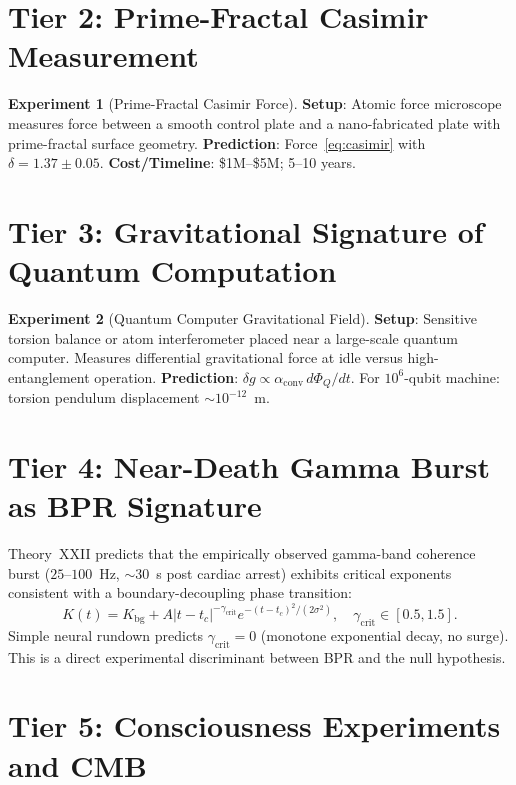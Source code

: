 \documentclass[12pt,oneside]{book}
\theoremstyle{definition}
\newtheorem{experiment}{Experiment}[chapter]
\begin{document}
\section{Tier 2: Prime-Fractal Casimir Measurement}

\begin{experiment}[Prime-Fractal Casimir Force]
  \textbf{Setup}: Atomic force microscope measures force between a smooth control
  plate and a nano-fabricated plate with prime-fractal surface geometry.
  \textbf{Prediction}: Force~\eqref{eq:casimir} with $\delta = 1.37 \pm 0.05$.
  \textbf{Cost/Timeline}: \$1M--\$5M; 5--10 years.
\end{experiment}

\section{Tier 3: Gravitational Signature of Quantum Computation}

\begin{experiment}[Quantum Computer Gravitational Field]
  \textbf{Setup}: Sensitive torsion balance or atom interferometer placed near a
  large-scale quantum computer. Measures differential gravitational force at idle
  versus high-entanglement operation.
  \textbf{Prediction}: $\delta g \propto \alpha_{\mathrm{conv}}\,d\Phi_Q/dt$.
  For $10^6$-qubit machine: torsion pendulum displacement $\sim 10^{-12}$~m.
\end{experiment}

\section{Tier 4: Near-Death Gamma Burst as BPR Signature}

Theory~XXII predicts that the empirically observed gamma-band coherence burst
($25$--$100$~Hz, $\sim 30$~s post cardiac arrest) exhibits critical exponents
consistent with a boundary-decoupling phase transition:
\begin{equation}
  K(t) = K_{\mathrm{bg}} + A|t - t_c|^{-\gamma_{\mathrm{crit}}}
         e^{-(t-t_c)^2/(2\sigma^2)}, \quad
  \gamma_{\mathrm{crit}} \in [0.5, 1.5].
\end{equation}
Simple neural rundown predicts $\gamma_{\mathrm{crit}} = 0$ (monotone exponential
decay, no surge). This is a direct experimental discriminant between BPR and
the null hypothesis.

\section{Tier 5: Consciousness Experiments and CMB}
\end{document}
